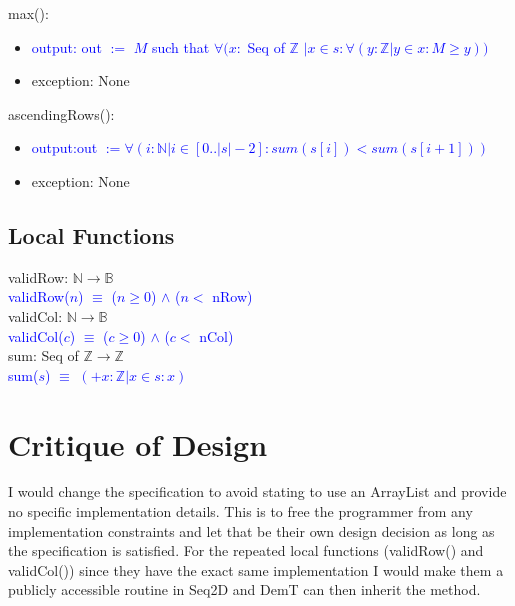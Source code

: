 \documentclass[12pt]{article}
\begin{document}
\noindent max():
\begin{itemize}
\item \textcolor{blue}{output: out $:=$ $M$ such that $\forall (x : $ Seq of $\mathbb{Z}$ $| x \in s : \forall (y : \mathbb{Z} | y \in x : M \geq y )) $}
\item exception: None
\end{itemize}

\noindent ascendingRows():
\begin{itemize}
\item \textcolor{blue}{output:out $:= \forall (i : \mathbb{N} | i \in [0..|s|-2] : sum(s[i]) < sum(s[i+1])) $}
\item exception: None
\end{itemize}

\subsection*{Local Functions}

\noindent validRow: $\mathbb{N} \rightarrow \mathbb{B}$\\
\noindent \textcolor{blue}{validRow($n$) $\equiv$ ($n \geq 0$) $\land$ ($n < $ nRow)}\\

\noindent validCol: $\mathbb{N} \rightarrow \mathbb{B}$\\
\noindent \textcolor{blue}{validCol($c$) $\equiv$ ($c \geq 0$) $\land$ ($c < $ nCol)}\\
  
\noindent sum: Seq of $\mathbb{Z} \rightarrow \mathbb{Z}$\\
\noindent \textcolor{blue}{sum($s$) $\equiv$ $(+x : \mathbb{Z} | x \in s: x)$}



\newpage

\section*{Critique of Design}


I would change the specification to avoid stating to use an ArrayList and provide no specific implementation details. This is to free the programmer from any implementation constraints and let that be their own design decision as long as the specification is satisfied. For the repeated local functions (validRow() and validCol()) since they have the exact same implementation I would make them a publicly accessible routine in Seq2D and DemT can then inherit the method. \\
\end{document}
